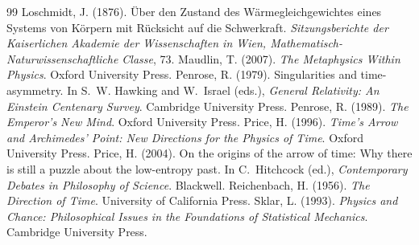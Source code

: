 \documentclass{situationist-preprint}
\begin{document}
\begin{thebibliography}{99}
 Loschmidt, J. (1876). Über den Zustand des Wärmegleichgewichtes eines Systems von Körpern mit Rücksicht auf die Schwerkraft. \emph{Sitzungsberichte der Kaiserlichen Akademie der Wissenschaften in Wien, Mathematisch-Naturwissenschaftliche Classe}, 73.
 Maudlin, T. (2007). \emph{The Metaphysics Within Physics}. Oxford University Press.
 Penrose, R. (1979). Singularities and time-asymmetry. In S.~W. Hawking and W.~Israel (eds.), \emph{General Relativity: An Einstein Centenary Survey}. Cambridge University Press.
 Penrose, R. (1989). \emph{The Emperor's New Mind}. Oxford University Press.
 Price, H. (1996). \emph{Time's Arrow and Archimedes' Point: New Directions for the Physics of Time}. Oxford University Press.
 Price, H. (2004). On the origins of the arrow of time: Why there is still a puzzle about the low-entropy past. In C.~Hitchcock (ed.), \emph{Contemporary Debates in Philosophy of Science}. Blackwell.
 Reichenbach, H. (1956). \emph{The Direction of Time}. University of California Press.
 Sklar, L. (1993). \emph{Physics and Chance: Philosophical Issues in the Foundations of Statistical Mechanics}. Cambridge University Press.
\end{thebibliography}
\end{document}
